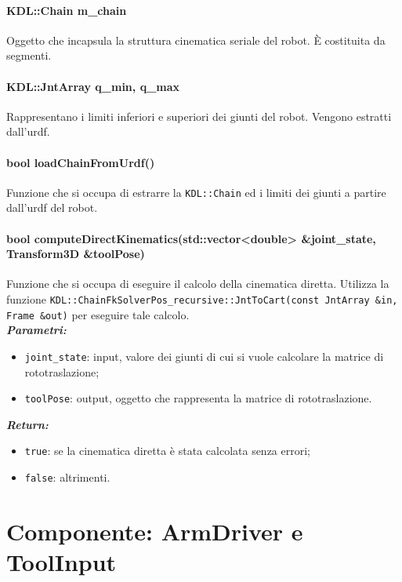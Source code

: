 \paragraph{KDL::Chain m\_chain}
Oggetto che incapsula la struttura cinematica seriale del robot. È costituita da segmenti.

\paragraph{KDL::JntArray q\_min, q\_max}
Rappresentano i limiti inferiori e superiori dei giunti del robot. Vengono estratti dall'urdf.

\paragraph{bool loadChainFromUrdf()}
Funzione che si occupa di estrarre la \texttt{KDL::Chain} ed i limiti dei giunti a partire dall'urdf del robot.

\paragraph{bool computeDirectKinematics(std::vector<double> \&joint\_state, Transform3D \&toolPose)}

Funzione che si occupa di eseguire il calcolo della cinematica diretta. Utilizza la funzione \texttt{KDL::ChainFkSolverPos\_recursive::JntToCart(const JntArray \&in, Frame \&out)} per eseguire tale calcolo.  \\
\textbf{\textit{Parametri:}}
\begin{itemize}
	\item \texttt{joint\_state}: input, valore dei giunti di cui si vuole calcolare la matrice di rototraslazione; 
	\item \texttt{toolPose}: output, oggetto che rappresenta la matrice di rototraslazione.
\end{itemize}
\textbf{\textit{Return:}}
\begin{itemize}
	\item \texttt{true}: se la cinematica diretta è stata calcolata senza errori;
	\item \texttt{false}: altrimenti.
\end{itemize}


\section{Componente: ArmDriver e ToolInput}

